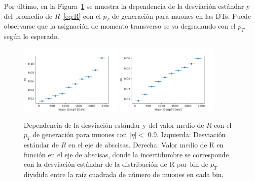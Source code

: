 \clearpage

Por \'ultimo, en la Figura~\ref{fig:data_R_genpt} se muestra la dependencia de la desviaci\'on est\'andar y del promedio de $R$~\eqref{eq:R} con el $p_{T}$ de generaci\'on para muones en las DTs. Puede observarse que la asignaci\'on de momento transverso se va degradando con el $p_{T}$ seg\'un lo esperado. \\

\begin{figure}[h!]
\centering
\includegraphics[width=0.45\textwidth]{figures/data_genpt_DT_sigmaR.png}
\includegraphics[width=0.45\textwidth]{figures/data_genpt_DT_R.png}
\caption{Dependencia de la desviaci\'on est\'andar y del valor medio de $R$ con el $p_{T}$ de generaci\'on para muones con $\lvert \eta \rvert <$ 0.9. Izquierda: Desviaci\'on est\'andar de $R$ en el eje de abscisas. Derecha: Valor medio de R en funci\'on en el eje de abscisas, donde la incertidumbre se corresponde con la desviación est\'andar de la distribuci\'on de R por bin de $p_{T}$ dividida entre la ra\'iz cuadrada de n\'umero de muones en cada bin.}
\label{fig:data_R_genpt}        
\end{figure}


\clearpage


 
